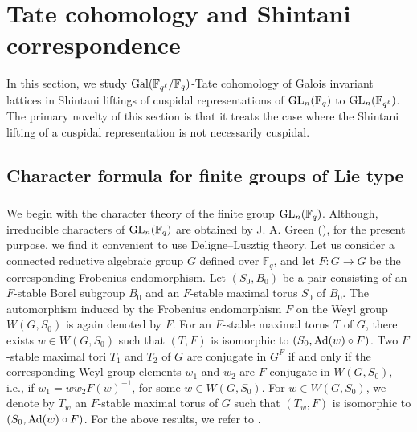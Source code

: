 \documentclass[10pt, reqno]{amsart}
\theoremstyle{plain}
\numberwithin{equation}{section} \newcommand{\di}{\operatorname{dim}}
\begin{document}
\section{Tate cohomology and Shintani correspondence}\label{sec_shintani}
In this section, we study ${\rm
  Gal}(\mathbb{F}_{q^\ell}/\mathbb{F}_{q})$-Tate cohomology of Galois
invariant lattices in Shintani liftings of cuspidal representations of
${\rm GL}_n(\mathbb{F}_q)$ to ${\rm GL}_n(\mathbb{F}_{q^\ell})$. The
primary novelty of this section is that it treats the case where the
Shintani lifting of a cuspidal representation is not necessarily
cuspidal. 
\subsection{Character formula for finite groups of Lie type}
\subsubsection{}
We begin with the character theory of the finite group
${\rm GL}_n(\mathbb{F}_q)$. Although, irreducible characters of
${\rm GL}_n(\mathbb{F}_q)$ are obtained by J. A. Green
(\cite{Green_finite_groups}), for the present purpose, we find it
convenient to use Deligne--Lusztig theory. Let us consider a connected
reductive algebraic group $G$ defined over $\mathbb{F}_q$, and let
$F:G\rightarrow G$ be the corresponding Frobenius endomorphism. Let
$(S_0, B_0)$ be a pair consisting of an $F$-stable Borel subgroup
$B_0$ and an $F$-stable maximal torus $S_0$ of $B_0$. The automorphism
induced by the Frobenius endomorphism $F$ on the Weyl group
$W(G, S_0)$ is again denoted by $F$. For an $F$-stable maximal torus
$T$ of $G$, there exists $w\in W(G, S_0)$ such that $(T, F)$ is
isomorphic to $(S_0, {\rm Ad}(w)\circ F)$. Two $F$-stable maximal tori
$T_1$ and $T_2$ of $G$ are conjugate in $G^F$ if and only if the
corresponding Weyl group elements $w_1$ and $w_2$ are $F$-conjugate in
$W(G, S_0)$, i.e., if $w_1=ww_2F(w)^{-1}$, for some $w\in W(G, S_0)$.
For $w\in W(G, S_0)$, we denote by $T_w$ an $F$-stable maximal torus
of $G$ such that $(T_w, F)$ is isomorphic to
$(S_0, {\rm Ad}(w)\circ F)$. For the above results, we refer to
\cite[Corollary 1.14]{Deligne_Luszting_paper}.
\end{document}
